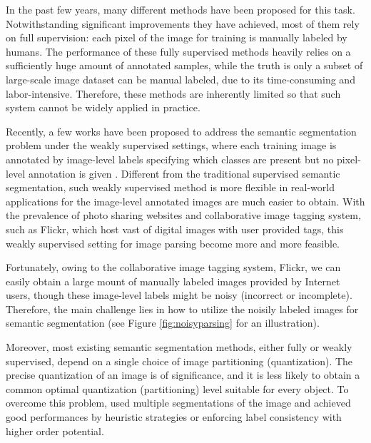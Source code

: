 \if
In the past few years, many different methods \cite{csurka2011efficient,gonfaus2010harmony,ladicky2009associative,nowozin2010parameter,shotton2008semantic,shotton2006textonboost,singh2013nonparametric,verbeek2007scene,yang2007multiple,yao2012describing} have been proposed for this task. Notwithstanding significant improvements they have achieved, most of them rely on full supervision: each pixel of the image for training is manually labeled by humans. The performance of these fully supervised methods heavily relies on a sufficiently huge amount of annotated samples, while the truth is only a subset of large-scale image dataset can be manual labeled, due to its time-consuming and labor-intensive. Therefore, these methods are inherently limited so that such system cannot be widely applied in practice.

Recently, a few works have been proposed to address the semantic segmentation problem under the weakly supervised settings, where each training image is annotated by image-level labels specifying which classes are present but no pixel-level annotation is given \cite{verbeek2007region,vezhnevets2010towards,vezhnevets2011weakly,vezhnevets2012weakly,xu2014tell,zhang2013sparse,zhang2013probabilistic}. Different from the traditional supervised semantic segmentation, such weakly supervised method is more flexible in real-world applications for the image-level annotated images are much easier to obtain. With the prevalence of photo sharing websites and collaborative image tagging system, such as Flickr, which host vast of digital images with user provided tags, this weakly supervised setting for image parsing become more and more feasible.

 Fortunately, owing to the collaborative image tagging system, \eg Flickr, we can easily obtain a large mount of manually labeled images provided by Internet users, though these image-level labels might be noisy (incorrect or incomplete). Therefore, the main challenge lies in how to utilize the noisily labeled images for semantic segmentation (see Figure \ref{fig:noisyparsing} for an illustration).


 Moreover, most existing semantic segmentation methods, either fully or weakly supervised, depend on a single choice of image partitioning (quantization). The precise quantization of an image is of significance, and it is less likely to obtain a common optimal quantization (partitioning) level suitable for every object. To overcome this problem, \cite{hoiem2005geometric,kohli2009robust,ladicky2009associative,nowozin2010parameter,russell2006using} used multiple segmentations of the image and achieved good performances by heuristic strategies or enforcing label consistency with higher order potential.

